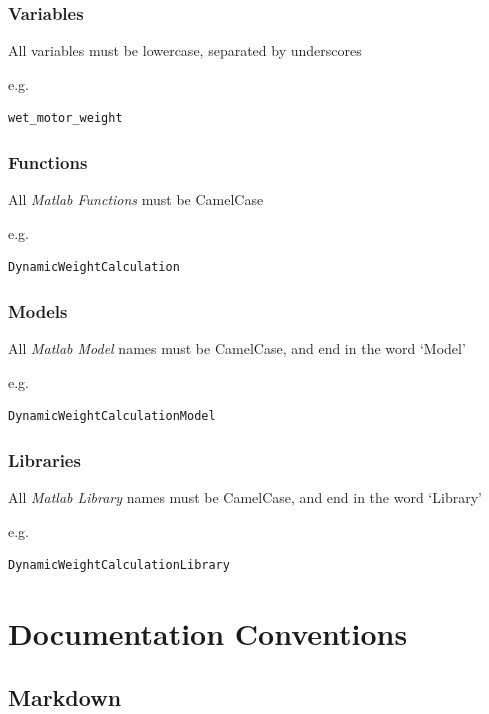 \documentclass[]{article}
\begin{document}
\subsubsection{Variables}\label{variables}

All variables must be lowercase, separated by underscores

e.g.

\begin{verbatim}
wet_motor_weight
\end{verbatim}

\subsubsection{Functions}\label{functions-1}

All \emph{Matlab Functions} must be CamelCase

e.g.

\begin{verbatim}
DynamicWeightCalculation
\end{verbatim}

\subsubsection{Models}\label{models-1}

All \emph{Matlab Model} names must be CamelCase, and end in the word
`Model'

e.g.

\begin{verbatim}
DynamicWeightCalculationModel
\end{verbatim}

\subsubsection{Libraries}\label{libraries-1}

All \emph{Matlab Library} names must be CamelCase, and end in the word
`Library'

e.g.

\begin{verbatim}
DynamicWeightCalculationLibrary
\end{verbatim}

\section{Documentation Conventions}\label{documentation-conventions}

\subsection{Markdown}\label{markdown}
\end{document}
